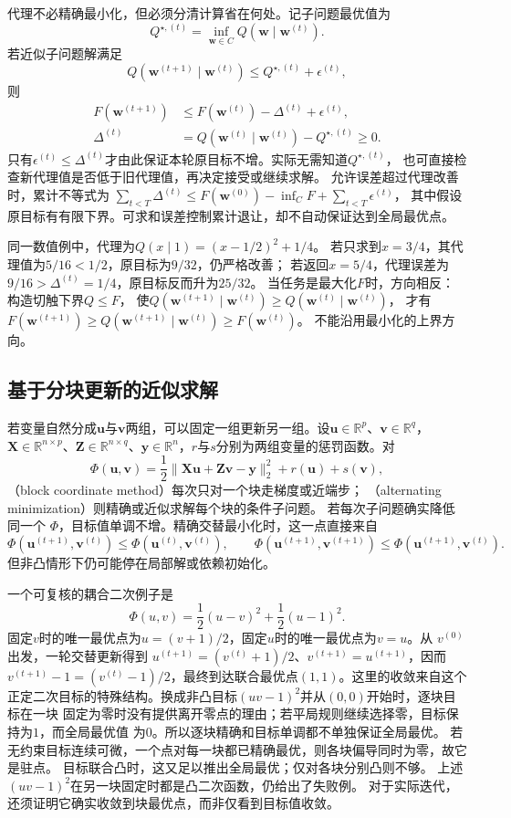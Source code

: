 代理不必精确最小化，但必须分清计算省在何处。记子问题最优值为
\[
 Q^{\star,(t)}=\inf_{\bm w\in C}Q(\bm w\mid\bm w^{(t)}).
\]
若近似子问题解满足
\[
 Q(\bm w^{(t+1)}\mid\bm w^{(t)})\leq Q^{\star,(t)}+\epsilon^{(t)},
\]
则
\[
 \begin{aligned}
 F(\bm w^{(t+1)})&\leq F(\bm w^{(t)})-\Delta^{(t)}+\epsilon^{(t)},\\
 \Delta^{(t)}&=Q(\bm w^{(t)}\mid\bm w^{(t)})-Q^{\star,(t)}\geq0.
 \end{aligned}
\]
只有$\epsilon^{(t)}\leq\Delta^{(t)}$才由此保证本轮原目标不增。实际无需知道$Q^{\star,(t)}$，
也可直接检查新代理值是否低于旧代理值，再决定接受或继续求解。
允许误差超过代理改善时，累计不等式为
$\sum_{t<T}\Delta^{(t)}\leq F(\bm w^{(0)})-\inf_C F+\sum_{t<T}\epsilon^{(t)}$，
其中假设原目标有有限下界。可求和误差控制累计退让，却不自动保证达到全局最优点。

同一数值例中，代理为$Q(x\mid1)=(x-1/2)^2+1/4$。
若只求到$x=3/4$，其代理值为$5/16<1/2$，原目标为$9/32$，仍严格改善；
若返回$x=5/4$，代理误差为$9/16>\Delta^{(t)}=1/4$，原目标反而升为$25/32$。
当任务是最大化$F$时，方向相反：构造切触下界$Q\leq F$，
使$Q(\bm w^{(t+1)}\mid\bm w^{(t)})\geq Q(\bm w^{(t)}\mid\bm w^{(t)})$，
才有$F(\bm w^{(t+1)})\geq Q(\bm w^{(t+1)}\mid\bm w^{(t)})\geq F(\bm w^{(t)})$。
不能沿用最小化的上界方向。

\subsection{基于分块更新的近似求解}
\label{sec:opt-block-alternating-distribution}

若变量自然分成$\bm{u}$与$\bm{v}$两组，可以固定一组更新另一组。设$\bm u\in\mathbb R^p$、$\bm v\in\mathbb R^q$，$\bm X\in\mathbb R^{n\times p}$、$\bm Z\in\mathbb R^{n\times q}$、$\bm y\in\mathbb R^n$，$r$与$s$分别为两组变量的惩罚函数。对
\[
  \Phi(\bm{u},\bm{v})
  =\frac12\lVert\bm{X}\bm{u}+\bm{Z}\bm{v}-\bm{y}\rVert_2^2
  +r(\bm{u})+s(\bm{v}),
\]
（block coordinate method）每次只对一个块走梯度或近端步；
（alternating minimization）则精确或近似求解每个块的条件子问题。
若每次子问题确实降低同一个
$\Phi$，目标值单调不增。精确交替最小化时，这一点直接来自
\[
  \Phi(\bm{u}^{(t+1)},\bm{v}^{(t)})
  \leq\Phi(\bm{u}^{(t)},\bm{v}^{(t)}),\qquad
  \Phi(\bm{u}^{(t+1)},\bm{v}^{(t+1)})
  \leq\Phi(\bm{u}^{(t+1)},\bm{v}^{(t)}).
\]
但非凸情形下仍可能停在局部解或依赖初始化。

一个可复核的耦合二次例子是
\[
  \Phi(u,v)=\frac12(u-v)^2+\frac12(u-1)^2.
\]
固定$v$时的唯一最优点为$u=(v+1)/2$，固定$u$时的唯一最优点为$v=u$。从
$v^{(0)}$出发，一轮交替更新得到
$u^{(t+1)}=(v^{(t)}+1)/2$、$v^{(t+1)}=u^{(t+1)}$，因而
$v^{(t+1)}-1=(v^{(t)}-1)/2$，最终到达联合最优点$(1,1)$。这里的收敛来自这个
正定二次目标的特殊结构。换成非凸目标$(uv-1)^2$并从$(0,0)$开始时，逐块目标在一块
固定为零时没有提供离开零点的理由；若平局规则继续选择零，目标保持为$1$，而全局最优值
为$0$。所以逐块精确和目标单调都不单独保证全局最优。
若无约束目标连续可微，一个点对每一块都已精确最优，则各块偏导同时为零，故它是驻点。
目标联合凸时，这又足以推出全局最优；仅对各块分别凸则不够。
上述$(uv-1)^2$在另一块固定时都是凸二次函数，仍给出了失败例。
对于实际迭代，还须证明它确实收敛到块最优点，而非仅看到目标值收敛。


